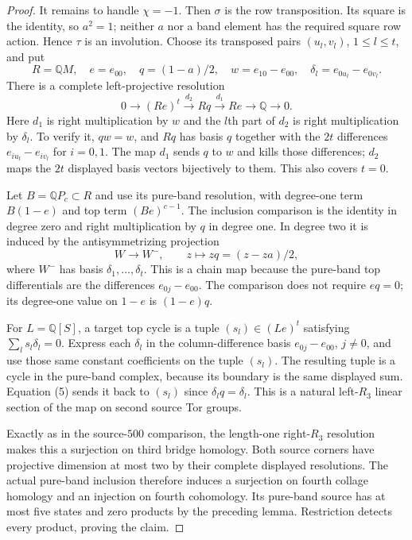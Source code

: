 \begin{proof}
It remains to handle $\chi=-1$.  Then $\sigma$ is the
row transposition.  Its square is the identity, so
$a^2=1$; neither $a$ nor a band element has the
required square row action.  Hence $\tau$ is an
involution.  Choose its transposed pairs $(u_l,v_l)$,
$1\le l\le t$, and put
\[
 R=\mathbb QM,\quad e=e_{00},\quad q=(1-a)/2,
 \quad w=e_{10}-e_{00},\quad
 \delta_l=e_{0u_l}-e_{0v_l}.
\]
There is a complete left-projective resolution
\[
 0\longrightarrow(Re)^t\xrightarrow{d_2}Rq
 \xrightarrow{d_1}Re\longrightarrow\mathbb Q
 \longrightarrow0.                                         \tag{4}
\]
Here $d_1$ is right multiplication by $w$ and the $l$th
part of $d_2$ is right multiplication by $\delta_l$.
To verify it, $qw=w$, and $Rq$ has basis $q$ together
with the $2t$ differences
$e_{iu_l}-e_{iv_l}$ for $i=0,1$.
The map $d_1$ sends $q$ to $w$ and kills those
differences; $d_2$ maps the $2t$ displayed basis
vectors bijectively to them.  This also covers $t=0$.

Let $B=\mathbb QP_c\subset R$ and use its pure-band
resolution, with degree-one term $B(1-e)$ and top
term $(Be)^{c-1}$.  The inclusion comparison is the
identity in degree zero and right multiplication
by $q$ in degree one.  In degree two it is induced
by the antisymmetrizing projection
\[
 W\longrightarrow W^-,\qquad z\longmapsto zq=(z-za)/2,
                                                               \tag{5}
\]
where $W^-$ has basis $\delta_1,\ldots,\delta_t$.
This is a chain map because the pure-band top
differentials are the differences $e_{0j}-e_{00}$.
The comparison does not require $eq=0$; its degree-one
value on $1-e$ is $(1-e)q$.

For $L=\mathbb Q[S]$, a target top cycle is a tuple
$(s_l)\in(Le)^t$ satisfying
$\sum_l s_l\delta_l=0$.
Express each $\delta_l$ in the column-difference
basis $e_{0j}-e_{00}$, $j\ne0$, and use those same
constant coefficients on the tuple $(s_l)$.
The resulting tuple is a cycle in the pure-band
complex, because its boundary is the same displayed
sum.  Equation (5) sends it back to $(s_l)$ since
$\delta_l q=\delta_l$.
This is a natural left-$R_3$ linear section of the
map on second source Tor groups.

Exactly as in the source-$500$ comparison, the
length-one right-$R_3$ resolution makes this a
surjection on third bridge homology.  Both source
corners have projective dimension at most two by
their complete displayed resolutions.  The actual
pure-band inclusion therefore induces a surjection
on fourth collage homology and an injection on
fourth cohomology.  Its pure-band source has at most
five states and zero products by the preceding lemma.
Restriction detects every product, proving the claim.
\end{proof}

